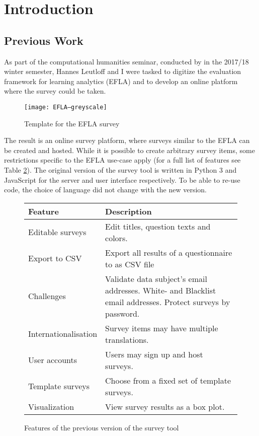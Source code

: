 \section{Introduction}

\subsection{Previous Work}
    As part of the computational humanities seminar, conducted by \profhd in the 2017/18 winter semester, Hannes Leutloff
    and I were tasked to digitize the evaluation framework for learning analytics (EFLA) \cite{efla} and to
    develop an online platform where the survey could be taken.

    \begin{figure}
        \centering
        \texttt{[image: EFLA--greyscale]}
        \caption{Template for the EFLA survey \cite{efla-website}}
        \label{fig:efla-template}
    \end{figure}

   The result is an online survey platform, where surveys similar to the EFLA can be created
   and hosted. While it is possible to create arbitrary survey items, some restrictions
   specific to the EFLA use-case apply (for a full list of features see Table \ref{table:v1-features}).
   The original version of the survey tool is written in Python 3 and JavaScript for the server
   and user interface respectively. To be able to re-use code, the choice of language did not
   change with the new version.
   

   \begin{figure}
       \begin{tabularx}{\textwidth}{|l|X|}
            \hline
            Feature & Description \\
            \hline \hline
            Editable surveys & Edit titles, question texts and colors.\\
            Export to CSV & Export all results of a questionnaire to as CSV file\\
            Challenges & Validate data subject's email addresses. 
            White- and Blacklist email addresses. Protect surveys by password.\\
            Internationalisation & Survey items may have multiple translations.\\
            User accounts & Users may sign up and host surveys.\\
            Template surveys & Choose from a fixed set of template surveys.\\
            Visualization & View survey results as a box plot.\\
            \hline
       \end{tabularx}
       \caption{Features of the previous version of the survey tool}
       \label{table:v1-features}
   \end{figure}

